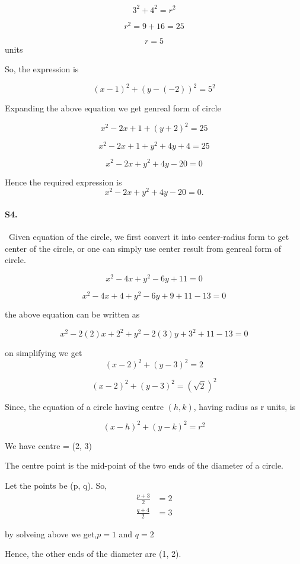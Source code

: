 \documentclass{article}
\begin{document}
$$3^2 + 4^2 = r^2$$

$$r^2 = 9 + 16 = 25$$

$$r = 5$$ units

So, the expression is

$$(x - 1)^2 + (y - (-2))^2 = 5^2$$

Expanding the above equation we get genreal form of circle

$$x^2 - 2x + 1 + (y + 2)^2 = 25$$

$$x^2 - 2x + 1 + y^2 + 4y + 4 = 25$$

$$x^2 - 2x + y^2 + 4y - 20 = 0$$

Hence the required expression is $$x^2 - 2x + y^2 + 4y - 20 = 0.$$
\paragraph{S4.}\
Given equation of the circle, we first convert it into center-radius form to get center of the circle, or one can simply use center result from genreal form of circle.

$$x^2 - 4x + y^2 - 6y + 11 = 0$$

$$x^2 - 4x + 4 + y^2 - 6y + 9 +11 - 13 = 0$$

the above equation can be written as

$$x^2 - 2 (2) x + 2^2 + y^2 - 2 (3) y + 3^2 +11 - 13 = 0$$

on simplifying we get
$$(x - 2)^2 + (y - 3)^2 = 2$$

$$(x - 2)^2 + (y - 3)^2 = (\sqrt{2})^2$$

Since, the equation of a circle having centre $(h, k)$, having radius as r units, is

$$(x - h)^2 + (y - k)^2 = r^2$$

We have centre = (2, 3)

The centre point is the mid-point of the two ends of the diameter of a circle.

Let the points be (p, q). So,
\begin{align*}
    \frac{p+3}{2}&=2\\
    \frac{q+4}{2}&=3
\end{align*}

by solveing above we get,$p = 1$ and $q = 2$

Hence, the other ends of the diameter are (1, 2).
\end{document}
